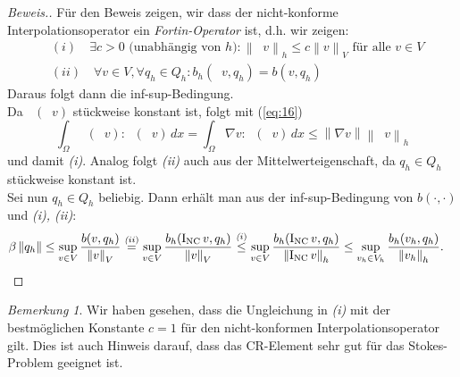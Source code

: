\documentclass[a4paper]{scrartcl}
\newcommand{\dx}{\,dx}
\newcommand{\vnorm}[1]{\left\lVert#1\right\rVert_V}
\newcommand{\norm}[1]{\left\lVert#1\right\rVert}
\newcommand{\hnorm}[1]{\left\lVert#1\right\rVert_h}
\DeclareMathOperator{\nablah}{\nabla_{\textit{h}}}
\DeclareMathOperator{\intOp}{I_{NC}}
\theoremstyle{plain}
\theoremstyle{definition}
\theoremstyle{remark}
\newtheorem*{remark*}{Bemerkung}
\begin{document}
\begin{proof}[Beweis.]
  Für den Beweis zeigen, wir dass der nicht-konforme
  Interpolationsoperator ein \emph{Fortin-Operator} ist, d.h. wir
  zeigen: 
 \begin{align}     
   &(i) \quad \exists c > 0 \text{ (unabhängig von } h\text{)} \colon
   \hnorm{\intOp v} \leq c \vnorm{v} \text{ für alle } v \in V \nonumber\\ 
   &(ii) \quad \forall v \in V, \forall q_h \in Q_h\colon b_h(\intOp v, q_h) = b(v, q_h) \nonumber
   \label{align:2} 
  \end{align}
  Daraus folgt dann die inf-sup-Bedingung. \\
  Da \(\nablah (\intOp v)\) stückweise konstant ist, folgt mit
  (\ref{eq:16})
  \begin{equation}
    \label{eq:18}
    \int_\Omega \nablah (\intOp v) : \nablah (\intOp v) \dx = 
    \int_\Omega \nabla v : \nablah (\intOp v) \dx \leq \norm{\nabla v}\hnorm{\intOp v}
  \end{equation}
  und damit \emph{(i)}. Analog folgt \emph{(ii)} auch aus
  der Mittelwerteigenschaft, da \(q_h \in Q_h\) stückweise konstant
  ist. \\ 
  Sei nun \(q_h \in Q_h\) beliebig. Dann erhält man aus der
  inf-sup-Bedingung von \(b(\cdot, \cdot)\) und \emph{(i), (ii)}: 
  \begin{align}
    \beta \norm{q_h} 
    &\leq \sup_{v\in V} \frac{b(v,q_h)}{\vnorm{v}}
    \overset{\emph(ii)}{=} \sup_{v\in V} \frac{b_h(\intOp v,q_h)}{\vnorm{v}}
    \overset{\emph(i)}{\leq} \sup_{v\in V} \frac{b_h(\intOp v,q_h)}{\hnorm{\intOp v}} \nonumber 
    \leq \sup_{v_h\in V_h} \frac{b_h(v_h,q_h)}{\hnorm{v_h}}. \nonumber
  \end{align}
\end{proof}

\begin{remark*}
  Wir haben gesehen, dass die Ungleichung in \emph{(i)} mit der
  bestmöglichen Konstante \(c=1\) für den nicht-konformen
  Interpolationsoperator \(\intOp\) gilt. Dies ist auch Hinweis
  darauf, dass das CR-Element sehr gut für das Stokes-Problem geeignet
  ist. 
\end{remark*}


\end{document}

